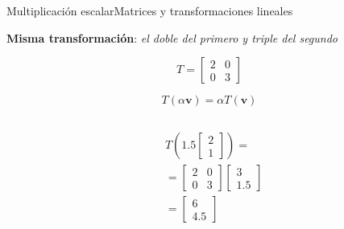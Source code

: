 \documentclass[spanish, c]{beamer}
\begin{document}
\begin{frame}{Multiplicación escalar}{Matrices y transformaciones lineales}

    \textbf{Misma transformación}: \textit{el doble del primero y triple del segundo}
    
    \bigskip

    $$T = \begin{bmatrix}
        2 & 0 \\
        0 & 3
    \end{bmatrix}$$

    $$T(\alpha\mathbf{v}) = \alpha T(\mathbf{v})$$

    \bigskip

    \begin{columns}
        \begin{column}{0.5\textwidth}
            \begin{align*}
                & T \left ( 1.5 
                \begin{bmatrix}
                    2 \\ 1
                \end{bmatrix} \right ) = \\[2ex]
                & =
                \begin{bmatrix}
                    2 & 0 \\
                    0 & 3
                \end{bmatrix}
                \begin{bmatrix}
                    3 \\ 1.5
                \end{bmatrix} \\
                & = 
                \begin{bmatrix}
                    6 \\ 4.5
                \end{bmatrix}
            \end{align*}
        \end{column}


\end{columns}
\end{frame}
\end{document}
